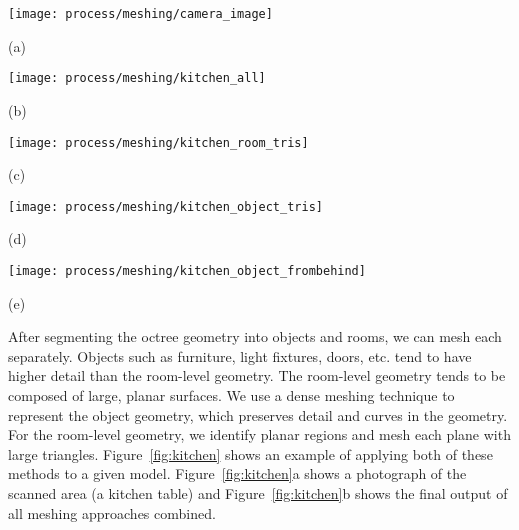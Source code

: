 \documentclass[review]{acmsiggraph}
\begin{document}
\begin{figure*}[t]

	\begin{minipage}[t]{0.3\linewidth}
		\centerline{\texttt{[image: process/meshing/camera\_image]}}
		\centerline{(a)}
	\end{minipage}
	\hfill
	\begin{minipage}[t]{0.3\linewidth}
		\centerline{\texttt{[image: process/meshing/kitchen\_all]}}
		\centerline{(b)}
	\end{minipage}
	\hfill
	\begin{minipage}[t]{0.3\linewidth}
		\centerline{\texttt{[image: process/meshing/kitchen\_room\_tris]}}
		\centerline{(c)}
	\end{minipage}
	
	\centering
	\begin{minipage}[t]{0.3\linewidth}
		\centerline{\texttt{[image: process/meshing/kitchen\_object\_tris]}}
		\centerline{(d)}
	\end{minipage}
	\begin{minipage}[t]{0.3\linewidth}
		\centerline{\texttt{[image: process/meshing/kitchen\_object\_frombehind]}}
		\centerline{(e)}
	\end{minipage}
	
	\caption{Example meshing output of residential area: (a) photo of area; (b) all reconstruction geometry; (c) geometry of room surfaces only, colored by planar region; (d) geometry of objects only; (e) geometry of objects from behind, showing watertightness.}
	\label{fig:kitchen}
\end{figure*}

After segmenting the octree geometry into objects and rooms, we can mesh each separately.  Objects such as furniture, light fixtures, doors, etc. tend to have higher detail than the room-level geometry.  The room-level geometry tends to be composed of large, planar surfaces.  We use a dense meshing technique to represent the object geometry, which preserves detail and curves in the geometry.  For the room-level geometry, we identify planar regions and mesh each plane with large triangles.  Figure~\ref{fig:kitchen} shows an example of applying both of these methods to a given model.  Figure~\ref{fig:kitchen}a shows a photograph of the scanned area (a kitchen table) and Figure~\ref{fig:kitchen}b shows the final output of all meshing approaches combined.
\end{document}
